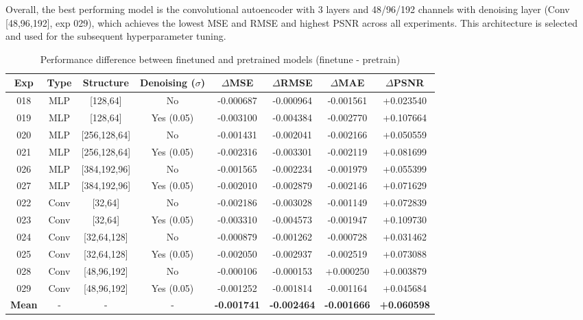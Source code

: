 \documentclass[10pt,letterpaper]{article}
\begin{document}
Overall, the best performing model is the convolutional autoencoder with 3 layers and 48/96/192 channels with denoising layer (Conv [48,96,192], exp 029), which achieves the lowest MSE and RMSE and highest PSNR across all experiments. This architecture is selected and used for the subsequent hyperparameter tuning.

\begin{table}[t]
\centering
\caption{Performance difference between finetuned and pretrained models
 (finetune - pretrain)}
\label{tab:delta_finetune_pretrain}
\scriptsize
\setlength{\tabcolsep}{4pt}
\begin{tabular}{c c c c c c c c}
\toprule
Exp & Type & Structure & Denoising ($\sigma$) & $\Delta$MSE & $\Delta$RMSE & $\Delta$MAE & $\Delta$PSNR \\
\midrule
018 & MLP  & [128,64]       & No         & -0.000687 & -0.000964 & -0.001561 & +0.023540 \\
019 & MLP  & [128,64]       & Yes (0.05) & -0.003100 & -0.004384 & -0.002770 & +0.107664 \\
020 & MLP  & [256,128,64]   & No         & -0.001431 & -0.002041 & -0.002166 & +0.050559 \\
021 & MLP  & [256,128,64]   & Yes (0.05) & -0.002316 & -0.003301 & -0.002119 & +0.081699 \\
026 & MLP  & [384,192,96]   & No         & -0.001565 & -0.002234 & -0.001979 & +0.055399 \\
027 & MLP  & [384,192,96]   & Yes (0.05) & -0.002010 & -0.002879 & -0.002146 & +0.071629 \\
\midrule
022 & Conv & [32,64]        & No         & -0.002186 & -0.003028 & -0.001149 & +0.072839 \\
023 & Conv & [32,64]        & Yes (0.05) & -0.003310 & -0.004573 & -0.001947 & +0.109730 \\
024 & Conv & [32,64,128]    & No         & -0.000879 & -0.001262 & -0.000728 & +0.031462 \\
025 & Conv & [32,64,128]    & Yes (0.05) & -0.002050 & -0.002937 & -0.002519 & +0.073088 \\
028 & Conv & [48,96,192]    & No         & -0.000106 & -0.000153 & +0.000250 & +0.003879 \\
029 & Conv & [48,96,192]    & Yes (0.05) & -0.001252 & -0.001814 & -0.001164 & +0.045684 \\
\midrule
\textbf{Mean} & - & - & - & \textbf{-0.001741} & \textbf{-0.002464} & \textbf{-0.001666} & \textbf{+0.060598} \\
\bottomrule
\end{tabular}
\end{table}
\end{document}
